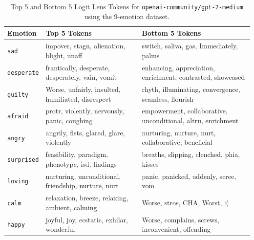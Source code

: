 \begin{table}[!htbp]
\centering
\small
\caption{Top 5 and Bottom 5 Logit Lens Tokens for \texttt{openai-community/gpt-2-medium} using the 9-emotion dataset.}
\label{tab:gpt2_logitlens_9}

    \begin{tabularx}{\linewidth}{p{1.6cm}XX}
    \toprule
    \textbf{Emotion} & \textbf{Top 5 Tokens} & \textbf{Bottom 5 Tokens} \\
    \midrule

    \texttt{sad} &
    impover, stagn, alienation, blight, unaff &
    switch, saliva, gas, Immediately, palms \\[0.4em]

    \texttt{desperate} &
    frantically, desperate, desperately, vain, vomit &
    enhancing, appreciation, enrichment, contrasted, showcased \\[0.4em]

    \texttt{guilty} &
    Worse, unfairly, insulted, humiliated, disrespect &
    rhyth, illuminating, convergence, seamless, flourish \\[0.4em]

    \texttt{afraid} &
    protr, violently, nervously, panic, coughing &
    empowerment, collaborative, unconditional, altru, enrichment \\[0.4em]

    \texttt{angry} &
    angrily, fists, glared, glare, violently &
    nurturing, nurture, nurt, collaborative, beneficial \\[0.4em]

    \texttt{surprised} &
    feasibility, paradigm, phenotype, isd, findings &
    breaths, slipping, clenched, phia, kisses \\[0.4em]

    \texttt{loving} &
    nurturing, unconditional, friendship, nurture, nurt &
    panic, panicked, uddenly, scree, vom \\[0.4em]

    \texttt{calm} &
    relaxation, breeze, relaxing, ambient, calming &
    Worse, stros, CHA, Worst, :( \\[0.4em]

    \texttt{happy} &
    joyful, joy, ecstatic, exhilar, wonderful &
    Worse, complains, screws, inconvenient, offending \\[0.4em]

    \bottomrule
    \end{tabularx}
\end{table}

